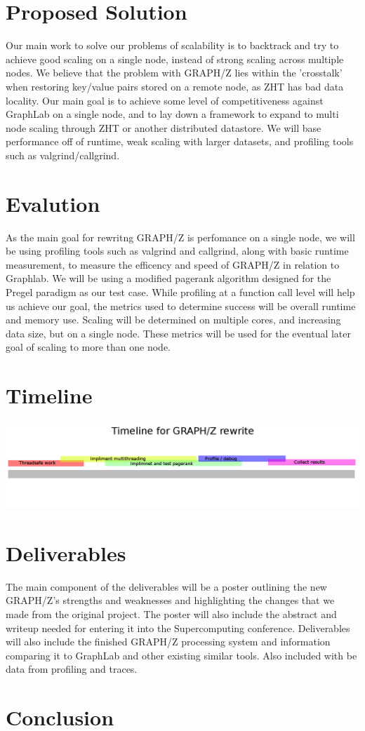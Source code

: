 \documentclass[10pt]{article}
\begin{document}
\begin{multicols}{2}
  \section{Proposed Solution}
  Our main work to solve our problems of scalability is to backtrack and try to achieve good scaling on a single node, instead of strong scaling across multiple nodes. We believe that the problem with GRAPH/Z lies within the 'crosstalk' when restoring key/value pairs stored on a remote node, as ZHT has bad data locality. Our main goal is to achieve some level of competitiveness against GraphLab on a single node, and to lay down a framework to expand to multi node scaling through ZHT or another distributed datastore. We will base performance off of runtime, weak scaling with larger datasets, and profiling tools such as valgrind/callgrind.
  \section{Evalution}
  As the main goal for rewritng GRAPH/Z is perfomance on a single node, we will be using profiling tools such as valgrind and callgrind, along with basic runtime measurement, to measure the efficency and speed of GRAPH/Z in relation to Graphlab. We will be using a modified pagerank algorithm designed for the Pregel paradigm as our test case. While profiling at a function call level will help us achieve our goal, the metrics used to determine success will be overall runtime and memory use. Scaling will be determined on multiple cores, and increasing data size, but on a single node.  These metrics will be used for the eventual later goal of scaling to more than one node.
\end{multicols}

  \section{Timeline}
  \includegraphics[width=\textwidth]{timeline.png}
\begin{multicols}{2}
  \section{Deliverables}
   The main component of the deliverables will be a poster outlining the new GRAPH/Z's strengths and weaknesses and highlighting the changes that we made from the original project. The poster will also include the abstract and writeup needed for entering it into the Supercomputing conference.  Deliverables will also include the finished GRAPH/Z processing system and information comparing it to GraphLab and other existing similar tools. Also included with be data from profiling and traces. 
  \section{Conclusion}
\end{multicols}
\end{document}
